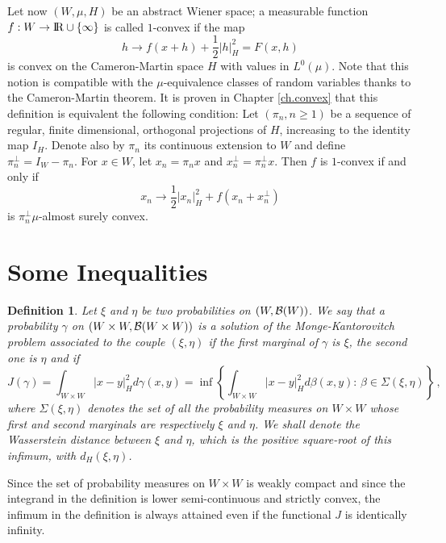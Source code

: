 \documentclass[12pt,a4paper]{book}
\newtheorem{definition}[theorem]{Definition}
\newcommand{\reals}{{\rm I\!R}}
\newcommand{\ga}{\gamma}
\newcommand{\calB}{{\cal B}}
\newcommand{\remark}{\noindent {\bf Remark:\ }}
\begin{document}
\noindent
Let now  $(W,\mu,H)$ be an abstract Wiener space;  a measurable  function
$f:W\to \reals\cup\{\infty\}$  is called $1$-convex if the map 
$$
h\to f(x+h)+\frac{1}{2}|h|_H^2=F(x,h)
$$
is convex on the Cameron-Martin space $H$ with values in
$L^0(\mu)$. Note that this notion is compatible with the
$\mu$-equivalence classes of random variables thanks to the
Cameron-Martin theorem. It is proven in Chapter  \ref{ch.convex} that 
this definition  is equivalent  the following condition:
Let $(\pi_n,n\geq 1)$ be a sequence of regular, finite dimensional,
 orthogonal projections of 
  $H$,  increasing to the identity map
  $I_H$. Denote also  by $\pi_n$ its  continuous extension  to $W$ and
  define $\pi_n^\bot=I_W-\pi_n$. For $x\in W$, let $x_n=\pi_nx$ and
  $x_n^\bot=\pi_n^\bot x$.   Then $f$ is $1$-convex if and only if 
$$
x_n\to \frac{1}{2}|x_n|_H^2+f(x_n+x_n^\bot)
$$ 
is  $\pi_n^\bot\mu$-almost surely convex.



\section{Some Inequalities}
\label{inequalities}
\begin{definition}
Let $\xi$ and $\eta$ be two probabilities on $(W,\calB(W))$. We say
that a probability $\ga$ on $(W\times W,\calB(W\times W))$ is a
solution of the Monge-Kantorovitch problem associated to the
couple $(\xi,\eta)$ if the first marginal of $\ga$ is $\xi$, the
second one is $\eta$ and if 
$$
J(\ga)=\int_{W\times W}|x-y|_H^2d\ga(x,y)=\inf\left\{\int_{W\times
  W}|x-y|_H^2d\beta(x,y):\,\beta\in \Sigma(\xi,\eta)\right\}\,,
$$
where $\Sigma(\xi,\eta)$ denotes the set of all the probability
measures on $W\times W$ whose first and second marginals are
respectively $\xi$ and $\eta$. We shall denote the Wasserstein
distance between $\xi$ and $\eta$, which is  the positive
square-root of  this infimum, with $d_H(\xi,\eta)$. 
\end{definition}
\remark
Since the set of probability measures on $W\times W$ is weakly compact
and since the integrand in the definition is lower semi-continuous and
strictly convex,  the infimum in the definition is always  attained
even if the functional $J$ is identically infinity.
\end{document}

